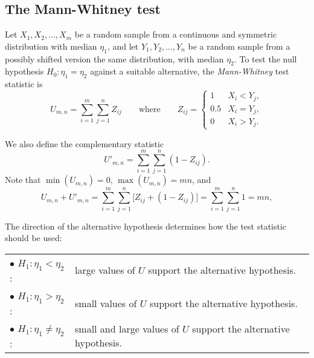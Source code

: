 \subsection{The Mann-Whitney test}\label{sec:mw_test}



\begin{definition}
Let $X_1,X_2,\ldots,X_m$ be a random sample from a continuous and symmetric distribution with median $\eta_1$, and let $Y_1,Y_2,\ldots,Y_n$ be a random sample from a possibly shifted version the same distribution, with median $\eta_2$. To test the null hypothesis $H_0:\eta_1=\eta_2$ against a suitable alternative, the \emph{Mann-Whitney} test statistic is
\[
U_{m,n} = \sum_{i=1}^m \sum_{j=1}^n Z_{ij} 
\qquad\text{where}\qquad 
Z_{ij} = \begin{cases} 
	1 	& X_i < Y_j, \\
	0.5	& X_i = Y_j, \\
	0	& X_i > Y_j.
\end{cases}
\]
\end{definition}

We also define the complementary statistic 
\[
U'_{m,n} = \displaystyle\sum_{i=1}^m \sum_{j=1}^n (1-Z_{ij}).
\]
Note that $\min(U_{m,n})=0$, $\max(U_{m,n})=mn$, and
\[
U_{m,n} + U'_{m,n} = \sum_{i=1}^m\sum_{j=1}^n \big[Z_{ij} + (1-Z_{ij})\big] = \sum_{i=1}^m\sum_{j=1}^n 1 = mn,
\]

The direction of the alternative hypothesis determines how the test statistic should be used:
\par
\begin{tabular}{ll}
$\bullet$ $H_1:\eta_1 < \eta_2$:			& large values of $U$ support the alternative hypothesis. \\
$\bullet$ $H_1:\eta_1 > \eta_2$:			& small values of $U$ support the alternative hypothesis. \\
$\bullet$ $H_1:\eta_1 \neq \eta_2$:\qquad	& small and large values of $U$ support the alternative hypothesis.
\end{tabular}

